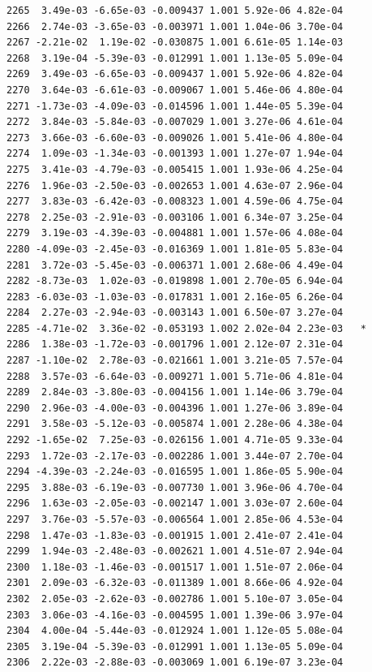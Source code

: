 \documentclass[
  letterpaper,
  DIV=11,
  numbers=noendperiod]{scrartcl}
\begin{document}
\begin{verbatim}
2265  3.49e-03 -6.65e-03 -0.009437 1.001 5.92e-06 4.82e-04    
2266  2.74e-03 -3.65e-03 -0.003971 1.001 1.04e-06 3.70e-04    
2267 -2.21e-02  1.19e-02 -0.030875 1.001 6.61e-05 1.14e-03    
2268  3.19e-04 -5.39e-03 -0.012991 1.001 1.13e-05 5.09e-04    
2269  3.49e-03 -6.65e-03 -0.009437 1.001 5.92e-06 4.82e-04    
2270  3.64e-03 -6.61e-03 -0.009067 1.001 5.46e-06 4.80e-04    
2271 -1.73e-03 -4.09e-03 -0.014596 1.001 1.44e-05 5.39e-04    
2272  3.84e-03 -5.84e-03 -0.007029 1.001 3.27e-06 4.61e-04    
2273  3.66e-03 -6.60e-03 -0.009026 1.001 5.41e-06 4.80e-04    
2274  1.09e-03 -1.34e-03 -0.001393 1.001 1.27e-07 1.94e-04    
2275  3.41e-03 -4.79e-03 -0.005415 1.001 1.93e-06 4.25e-04    
2276  1.96e-03 -2.50e-03 -0.002653 1.001 4.63e-07 2.96e-04    
2277  3.83e-03 -6.42e-03 -0.008323 1.001 4.59e-06 4.75e-04    
2278  2.25e-03 -2.91e-03 -0.003106 1.001 6.34e-07 3.25e-04    
2279  3.19e-03 -4.39e-03 -0.004881 1.001 1.57e-06 4.08e-04    
2280 -4.09e-03 -2.45e-03 -0.016369 1.001 1.81e-05 5.83e-04    
2281  3.72e-03 -5.45e-03 -0.006371 1.001 2.68e-06 4.49e-04    
2282 -8.73e-03  1.02e-03 -0.019898 1.001 2.70e-05 6.94e-04    
2283 -6.03e-03 -1.03e-03 -0.017831 1.001 2.16e-05 6.26e-04    
2284  2.27e-03 -2.94e-03 -0.003143 1.001 6.50e-07 3.27e-04    
2285 -4.71e-02  3.36e-02 -0.053193 1.002 2.02e-04 2.23e-03   *
2286  1.38e-03 -1.72e-03 -0.001796 1.001 2.12e-07 2.31e-04    
2287 -1.10e-02  2.78e-03 -0.021661 1.001 3.21e-05 7.57e-04    
2288  3.57e-03 -6.64e-03 -0.009271 1.001 5.71e-06 4.81e-04    
2289  2.84e-03 -3.80e-03 -0.004156 1.001 1.14e-06 3.79e-04    
2290  2.96e-03 -4.00e-03 -0.004396 1.001 1.27e-06 3.89e-04    
2291  3.58e-03 -5.12e-03 -0.005874 1.001 2.28e-06 4.38e-04    
2292 -1.65e-02  7.25e-03 -0.026156 1.001 4.71e-05 9.33e-04    
2293  1.72e-03 -2.17e-03 -0.002286 1.001 3.44e-07 2.70e-04    
2294 -4.39e-03 -2.24e-03 -0.016595 1.001 1.86e-05 5.90e-04    
2295  3.88e-03 -6.19e-03 -0.007730 1.001 3.96e-06 4.70e-04    
2296  1.63e-03 -2.05e-03 -0.002147 1.001 3.03e-07 2.60e-04    
2297  3.76e-03 -5.57e-03 -0.006564 1.001 2.85e-06 4.53e-04    
2298  1.47e-03 -1.83e-03 -0.001915 1.001 2.41e-07 2.41e-04    
2299  1.94e-03 -2.48e-03 -0.002621 1.001 4.51e-07 2.94e-04    
2300  1.18e-03 -1.46e-03 -0.001517 1.001 1.51e-07 2.06e-04    
2301  2.09e-03 -6.32e-03 -0.011389 1.001 8.66e-06 4.92e-04    
2302  2.05e-03 -2.62e-03 -0.002786 1.001 5.10e-07 3.05e-04    
2303  3.06e-03 -4.16e-03 -0.004595 1.001 1.39e-06 3.97e-04    
2304  4.00e-04 -5.44e-03 -0.012924 1.001 1.12e-05 5.08e-04    
2305  3.19e-04 -5.39e-03 -0.012991 1.001 1.13e-05 5.09e-04    
2306  2.22e-03 -2.88e-03 -0.003069 1.001 6.19e-07 3.23e-04    

\end{verbatim}
\end{document}
